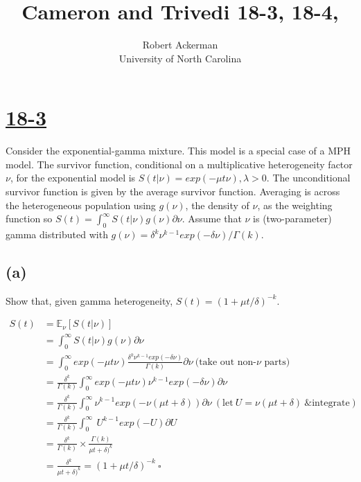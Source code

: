 \documentclass[11pt]{article}
\title{Cameron and Trivedi 18-3, 18-4,}
\author{Robert Ackerman \\ University of North Carolina}
\theoremstyle{definition}
\begin{document}
\maketitle
{}

\section*{\underline{18-3}}
Consider the exponential-gamma mixture.  This model is a special case of a MPH model.  The survivor function, conditional on a multiplicative heterogeneity factor $\nu$, for the exponential model is $S(t|\nu) = exp(-\mu t \nu), \lambda > 0$. The unconditional survivor function is given by the average survivor function.  Averaging is across the heterogeneous population using $g(\nu)$, the density of $\nu$, as the weighting function so $S(t) = \int_0^\infty S(t|\nu)g(\nu)\partial{} \nu $.  Assume that $\nu$ is (two-parameter) gamma distributed with $g(\nu) = \delta^k \nu^{k-1} exp(-\delta \nu)/\Gamma(k)$.   

\subsection*{(a)} 
Show that, given gamma heterogeneity, $S(t) = (1 + \mu t / \delta)^{-k}.$

\begin{equation*}
\begin{split}
S(t) & = \mathbb{E}_{\nu} \left[ S(t|\nu)\right] \\
 & = \int_0^\infty S(t|\nu)g(\nu)\partial \nu \\
 & = \int_0^\infty exp(-\mu t \nu) \frac{\delta^k \nu^{k-1} exp(-\delta \nu)}{\Gamma(k)} \partial \nu \ \text{(take out non-$\nu$ parts)}\\
 & = \frac{\delta^k}{\Gamma({k})} \int_0^\infty exp(-\mu t \nu) \nu^{k-1} exp(-\delta \nu)\partial \nu \\
 & = \frac{\delta^k}{\Gamma({k})} \int_0^\infty \nu^{k-1}exp(-\nu (\mu t + \delta))\partial \nu \ (\text{let} \ U = \nu (\mu t + \delta) \ \text{\& integrate})\\
 & =  \frac{\delta^k}{\Gamma({k})} \int_0^\infty \ U^{k-1} exp(-U) \partial U \\
 & = \frac{\delta^k}{\Gamma({k})} \times \frac{\Gamma(k)}{\mu t +\delta)^k} \\
 & = \frac{\delta^k}{\mu t +\delta)^k} = (1 + \mu t/\delta)^{-k} \ \square
\end{split}
\end{equation*}
\end{document}
